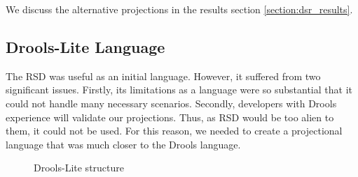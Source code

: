 We discuss the alternative projections in the results section \ref{section:dsr_results}.

\newpage
\subsection{Drools-Lite Language}
\label{section:DroolsLite}

The RSD was useful as an initial language. 
However, it suffered from two significant issues.
Firstly, its limitations as a language were so substantial that it could not handle many necessary scenarios.
Secondly, developers with Drools experience will validate our projections. 
Thus, as RSD would be too alien to them, it could not be used. 
For this reason, we needed to create a projectional language that was much closer to the Drools language.

\begin{figure}[htbp]
    \centering
    \caption{Drools-Lite structure}
    \label{fig:DroolsLiteDiagram}
\end{figure}
 

